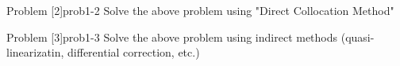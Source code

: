 \begin{problem}{Problem [2]}{prob1-2}
Solve the above problem using "Direct Collocation Method"


\end{problem}

\begin{problem}{Problem [3]}{prob1-3}
Solve the above problem using indirect methods (quasi-linearizatin, differential correction, etc.)


\end{problem}



